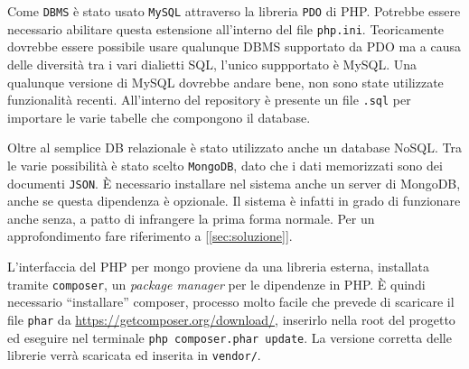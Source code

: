 Come \texttt{DBMS} è stato usato \texttt{MySQL} attraverso la libreria \texttt{PDO} di PHP. Potrebbe essere necessario abilitare questa estensione all'interno del file \texttt{php.ini}. Teoricamente dovrebbe essere possibile usare qualunque DBMS supportato da PDO ma a causa delle diversità tra i vari dialietti SQL, l'unico suppportato è MySQL. Una qualunque versione di MySQL dovrebbe andare bene, non sono state utilizzate funzionalità recenti. All'interno del repository è presente un file \texttt{.sql} per importare le varie tabelle che compongono il database.

Oltre al semplice DB relazionale è stato utilizzato anche un database NoSQL. Tra le varie possibilità è stato scelto \texttt{MongoDB}, dato che i dati memorizzati sono dei documenti \texttt{JSON}. È necessario installare nel sistema anche un server di MongoDB, anche se questa dipendenza è opzionale. Il sistema è infatti in grado di funzionare anche senza, a patto di infrangere la prima forma normale. Per un approfondimento fare riferimento a [\ref{sec:soluzione}]. 

L'interfaccia del PHP per mongo proviene da una libreria esterna, installata tramite \texttt{composer}, un \emph{package manager} per le dipendenze in PHP. È quindi necessario ``installare'' composer, processo molto facile che prevede di scaricare il file \texttt{phar} da \url{https://getcomposer.org/download/}, inserirlo nella root del progetto ed eseguire nel terminale \texttt{php composer.phar update}. La versione corretta delle librerie verrà scaricata ed inserita in \texttt{vendor/}.